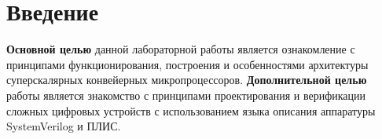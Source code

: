 \chapter*{Введение}

\textbf{Основной целью} данной лабораторной работы является ознакомление с принципами функционирования, построения и особенностями архитектуры суперскалярных конвейерных микропроцессоров.
\textbf{Дополнительной целью} работы является знакомство с принципами проектирования и верификации сложных цифровых устройств с использованием языка описания аппаратуры SystemVerilog и ПЛИС.
